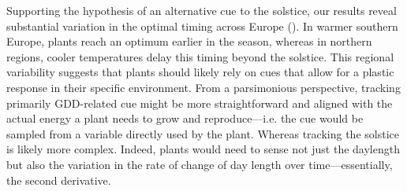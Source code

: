 \documentclass[11pt,letter]{article}
\begin{document}
Supporting the hypothesis of an alternative cue to the solstice, our results reveal substantial variation in the optimal timing across Europe (). In warmer southern Europe, plants reach an optimum earlier in the season, whereas in northern regions, cooler temperatures delay this timing beyond the solstice. 
This regional variability suggests that plants should likely 
rely on cues that allow for a plastic response in their specific environment. 
From a parsimonious perspective, tracking primarily GDD-related cue might be more straightforward and aligned with the actual energy a plant needs to grow and reproduce---i.e. the cue would be sampled from a variable directly used by the plant.
Whereas tracking the solstice is likely more complex. Indeed, plants would need to sense not just the daylength but also the variation in the rate of change of day length over time---essentially, the second derivative.


\end{document}
